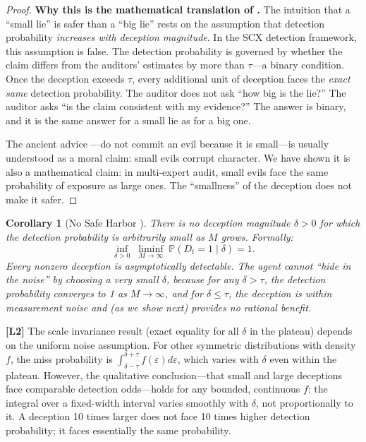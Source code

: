 \documentclass[11pt,a4paper]{article}
\newtheorem{corollary}[theorem]{Corollary}
\theoremstyle{definition}
\theoremstyle{remark}
\newcommand{\limitationTag}[1]{\textsf{\textbf{[L#1]}}}
\newcommand{\SCX}{\textsc{SCX}}
\newcommand{\Pbb}{\mathbb{P}}
\newcommand{\deception}{\delta}
\newcommand{\threshold}{\tau}
\begin{document}
\begin{proof}
\medskip
\noindent\textbf{Why this is the mathematical translation of .}
The intuition that a ``small lie'' is safer than a ``big lie'' rests on the assumption that detection probability \emph{increases with deception magnitude}. In the \SCX{} detection framework, this assumption is false. The detection probability is governed by whether the claim differs from the auditors' estimates by more than $\threshold$---a binary condition. Once the deception exceeds $\threshold$, every additional unit of deception faces the \emph{exact same} detection probability. The auditor does not ask ``how big is the lie?'' The auditor asks ``is the claim consistent with my evidence?'' The answer is binary, and it is the same answer for a small lie as for a big one.

The ancient advice ---do not commit an evil because it is small---is usually understood as a moral claim: small evils corrupt character. We have shown it is also a mathematical claim: in multi-expert audit, small evils face the same probability of exposure as large ones. The ``smallness'' of the deception does not make it safer.
\end{proof}

\begin{corollary}[No Safe Harbor ]
\label{cor:no_safe_harbor}
There is no deception magnitude $\deception > 0$ for which the detection probability is arbitrarily small as $M$ grows. Formally:
\begin{equation}
    \inf_{\deception > 0} \; \liminf_{M \to \infty} \; \Pbb(D_t = 1 \mid \deception) = 1.
\end{equation}
Every nonzero deception is asymptotically detectable. The agent cannot ``hide in the noise'' by choosing a very small $\deception$, because for any $\deception > \threshold$, the detection probability converges to 1 as $M \to \infty$, and for $\deception \leq \threshold$, the deception is within measurement noise and (as we show next) provides no rational benefit.
\end{corollary}

\limitationTag{2} The scale invariance result (exact equality for all $\deception$ in the plateau) depends on the uniform noise assumption. For other symmetric distributions with density $f$, the miss probability is $\int_{\deception-\threshold}^{\deception+\threshold} f(\varepsilon) d\varepsilon$, which varies with $\deception$ even within the plateau. However, the qualitative conclusion---that small and large deceptions face comparable detection odds---holds for any bounded, continuous $f$: the integral over a fixed-width interval varies smoothly with $\deception$, not proportionally to it. A deception 10 times larger does not face 10 times higher detection probability; it faces essentially the same probability.
\end{document}
